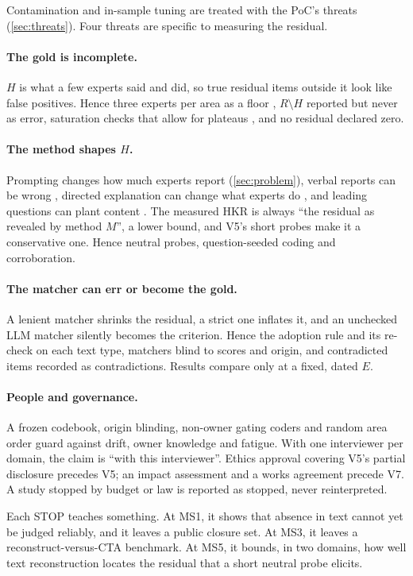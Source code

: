 Contamination and in-sample tuning are treated with the PoC's threats (\cref{sec:threats}). Four
threats are specific to measuring the residual.

\paragraph{The gold is incomplete.} $H$ is what a few experts said and did, so true residual items
outside it look like false positives. Hence three experts per area as a floor
\parencite{chao1994percentage}, $R \setminus H$ reported but never as error, saturation checks that
allow for plateaus \parencite{guest2020simple,hennink2022sample}, and no residual declared zero.

\paragraph{The method shapes $H$.} Prompting changes how much experts report (\cref{sec:problem}),
verbal reports can be wrong \parencite{nisbett1977telling}, directed explanation can change what
experts do \parencite{fox2011procedures,ericsson1980verbal}, and leading questions can plant content
\parencite{loftus1975leading}. The measured HKR is always \enquote{the residual as revealed by
method $M$}, a lower bound, and V5's short probes make it a conservative one. Hence neutral probes,
question-seeded coding and corroboration.

\paragraph{The matcher can err or become the gold.} A lenient matcher shrinks the residual, a
strict one inflates it, and an unchecked LLM matcher silently becomes the criterion. Hence the
adoption rule and its re-check on each text type, matchers blind to scores and origin, and
contradicted items recorded as contradictions. Results compare only at a fixed, dated $E$.

\paragraph{People and governance.} A frozen codebook, origin blinding, non-owner gating coders and
random area order guard against drift, owner knowledge and fatigue. With one interviewer per domain,
the claim is \enquote{with this interviewer}.
Ethics approval covering V5's partial disclosure precedes V5; an impact assessment and a works
agreement precede V7. A study stopped by budget or law is reported as stopped, never
reinterpreted.

\evint{} Each STOP teaches something. At MS1, it shows that absence in text cannot yet be judged
reliably, and it leaves a public closure set. At MS3, it leaves a reconstruct-versus-CTA benchmark.
At MS5, it bounds, in two domains, how well text reconstruction locates the residual that a short
neutral probe elicits.
